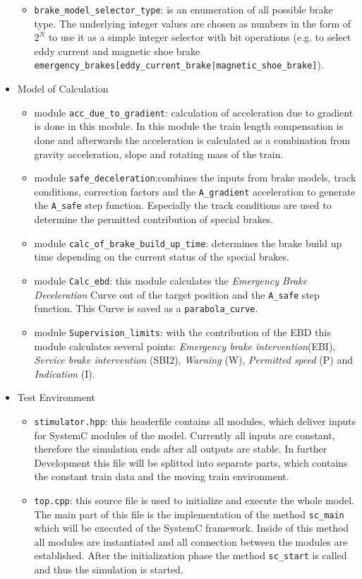 \documentclass{template/openetcs_article}
\begin{document}
\begin{itemize}
\begin{itemize}
	\item \verb|brake_model_selector_type|: is an enumeration of all possible brake type. The underlying integer values are chosen as numbers in the form of $2^N$ to use it as a simple integer selector with bit operations (e.g. to select eddy current and magnetic shoe brake \verb!emergency_brakes[eddy_current_brake|magnetic_shoe_brake]!).
	\end{itemize}		
	\item Model of Calculation
	\begin{itemize}
	\item module \verb|acc_due_to_gradient|: calculation of acceleration due to gradient is done in this module. In this module the train length compensation is done and afterwards the acceleration is calculated as a combination from gravity acceleration, slope and rotating mass of the train.
	\item module \verb|safe_deceleration|:combines the inputs from brake models, track conditions, correction factors and the \verb|A_gradient| acceleration to generate the \verb|A_safe| step function. Especially the track conditions are used to determine the permitted contribution of special brakes.
	
	\item module \verb|calc_of_brake_build_up_time|: determines the brake build up time depending on the current status of the special brakes.
	
	\item module \verb|Calc_ebd|: this module calculates the \emph{Emergency Brake Deceleration} Curve out of the target position and the \verb|A_safe| step function. This Curve is saved as a \verb|parabola_curve|. 
		\item module \verb|Supervision_limits|: with the contribution of the EBD this module calculates several points: \emph{Emergency brake intervention}(EBI), \emph{Service brake intervention} (SBI2), \emph{Warning} (W), \emph{Permitted speed} (P) and \emph{Indication} (I).
	
	\end{itemize}		
	\item Test Environment
	\begin{itemize}
		\item \verb|stimulator.hpp|: this headerfile contains all modules, which deliver inputs for SystemC modules of the model. Currently all inputs are constant, therefore the simulation ends after all outputs are stable. In further Development this file will be splitted into separate parts, which contains the constant train data and the moving train environment.
		\item \verb|top.cpp|: this source file is used to initialize and execute the whole model. The main part of this file is the implementation of the method \verb|sc_main| which will be executed of the SystemC framework. Inside of this method all modules are instantiated and all connection between the modules are established. After the initialization phase the method \verb|sc_start| is called and thus the simulation is started.
	\end{itemize}
\end{itemize}
\end{document}
